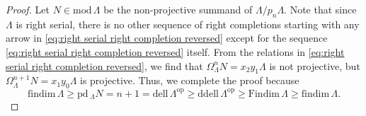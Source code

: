 \documentclass[10pt,a4paper]{amsart}
\newcommand{\Findim}{\mathrm{Findim}\,}
\newcommand{\ddell}{\mathrm{ddell}\,}
\newcommand{\dell}{\mathrm{dell}\,}
\newcommand{\findim}{\mathrm{findim}\,}
\newcommand{\op}{\mathrm{op}}
\newcommand{\pd}{\mathrm{pd}\,}
\renewcommand{\mod}{\mathrm{mod}\,}
\begin{document}
\begin{proof}
Let $N\in\mod\Lambda$ be the non-projective summand of $\Lambda/p_n\Lambda$. Note that since $\Lambda$ is right serial, there is no other sequence of right completions starting with any arrow in \eqref{eq:right serial right completion reversed} except for the sequence \eqref{eq:right serial right completion reversed} itself. From the relations in \eqref{eq:right serial right completion reversed}, we find that $\Omega_{\Lambda}^n N = x_2y_1\Lambda$ is not projective, but $\Omega_{\Lambda}^{n+1} N= x_1y_0\Lambda$ is projective. Thus, we complete the proof because
\[
\findim\Lambda \geq \pd\!_{\Lambda} N = n+1 = \dell\Lambda^{\op}\geq\ddell\Lambda^{\op}\geq\Findim\Lambda\geq\findim\Lambda.
\]
\end{proof}
\end{document}
